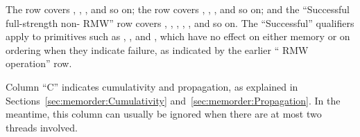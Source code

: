 The  row covers ,
, , and so on;
the  row covers ,
, , and so on; and
the ``Successful full-strength non- RMW'' row covers
, , ,
, , and so on.
The ``Successful'' qualifiers apply to primitives such as
, , and ,
which have no effect on either memory or on ordering when they indicate
failure, as indicated by the earlier `` RMW operation'' row.

Column ``C'' indicates cumulativity and propagation, as explained in
Sections~\ref{sec:memorder:Cumulativity}
and~\ref{sec:memorder:Propagation}.
In the meantime, this column can usually be ignored when there
are at most two threads involved.

